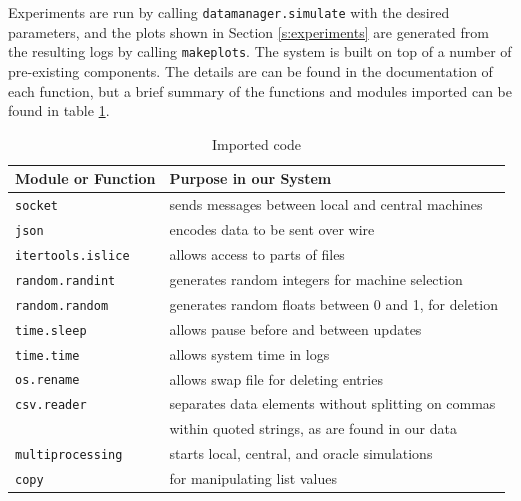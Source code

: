 Experiments are run by calling \texttt{datamanager.simulate} with the desired parameters, and the plots shown in Section \ref{s:experiments} are generated from the resulting logs by calling \texttt{makeplots}. The system is built on top of a number of pre-existing components. The details are can be found in the documentation of each function, but a brief summary of the functions and modules imported can be found in table \ref{tab:modules}. 

\begin{table}
\centering
\begin{tabular}{l|l}
Module or Function & Purpose in our System \\
\hline
    \texttt{socket} & sends messages between local and central machines \\
    \texttt{json} & encodes data to be sent over wire \\
    \texttt{itertools.islice} & allows access to parts of files\\
    \texttt{random.randint} & generates random integers for machine selection\\
    \texttt{random.random} & generates random floats between 0 and 1, for deletion\\
    \texttt{time.sleep} & allows pause before and between updates\\
    \texttt{time.time} & allows system time in logs\\
    \texttt{os.rename} & allows swap file for deleting entries\\
    \texttt{csv.reader} & separates data elements without splitting on commas \\
    & within quoted strings, as are found in our data\\
    \texttt{multiprocessing} & starts local, central, and oracle simulations\\
    \texttt{copy} & for manipulating list values
\end{tabular}
\caption{Imported code}
\label{tab:modules}
\end{table}



